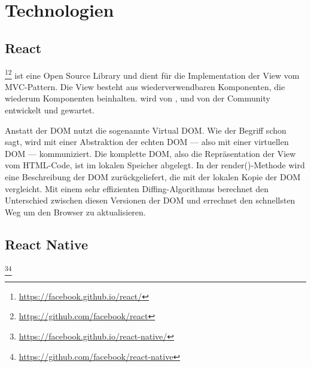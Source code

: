 \chapter{Technologien}
\label{pd-technologien}

\section{React} 
\footnote{\url{https://facebook.github.io/react/}}\footnote{\url{https://github.com/facebook/react}} ist eine Open Source  \gls{Library} und dient für die Implementation der View vom \gls{MVC}-Pattern. 
Die View besteht aus wiederverwendbaren Komponenten, die wiederum Komponenten beinhalten.
 wird von ,  und von der Community entwickelt und gewartet. 
\cite{react}



Anstatt der \gls{DOM} nutzt  die sogenannte \gls{Virtual DOM}.
Wie der Begriff schon sagt, wird mit einer Abstraktion der echten \gls{DOM} --- also mit einer virtuellen DOM --- kommuniziert.
Die komplette \gls{DOM}, also die Repräsentation der View vom HTML-Code, ist im lokalen Speicher abgelegt.\cite{virtual-dom} 
In der render()-Methode wird eine Beschreibung der DOM zurückgeliefert, die  mit der lokalen Kopie der \gls{DOM} vergleicht.
Mit einem sehr effizienten Diffing-Algorithmus berechnet  den Unterschied zwischen diesen  Versionen der \gls{DOM} und errechnet den schnellsten Weg um den Browser zu aktualisieren. 
\cite{react-virtual-dom}



\section{React Native}
\footnote{\url{https://facebook.github.io/react-native/}}\footnote{\url{https://github.com/facebook/react-native}} 


